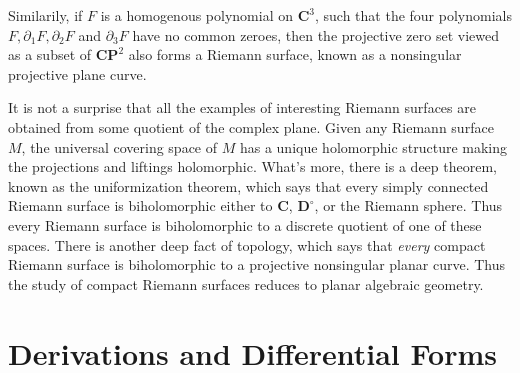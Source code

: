 \begin{example}
    Similarily, if $F$ is a homogenous polynomial on $\mathbf{C}^3$, such that the four polynomials $F, \partial_1 F, \partial_2 F$ and $\partial_3 F$ have no common zeroes, then the projective zero set viewed as a subset of $\mathbf{CP}^2$ also forms a Riemann surface, known as a nonsingular projective plane curve.
\end{example}

It is not a surprise that all the examples of interesting Riemann surfaces are obtained from some quotient of the complex plane. Given any Riemann surface $M$, the universal covering space of $M$ has a unique holomorphic structure making the projections and liftings holomorphic. What's more, there is a deep theorem, known as the uniformization theorem, which says that every simply connected Riemann surface is biholomorphic either to $\mathbf{C}$, $\mathbf{D}^\circ$, or the Riemann sphere. Thus every Riemann surface is biholomorphic to a discrete quotient of one of these spaces. There is another deep fact of topology, which says that {\it every} compact Riemann surface is biholomorphic to a projective nonsingular planar curve. Thus the study of compact Riemann surfaces reduces to planar algebraic geometry.

\section{Derivations and Differential Forms}

